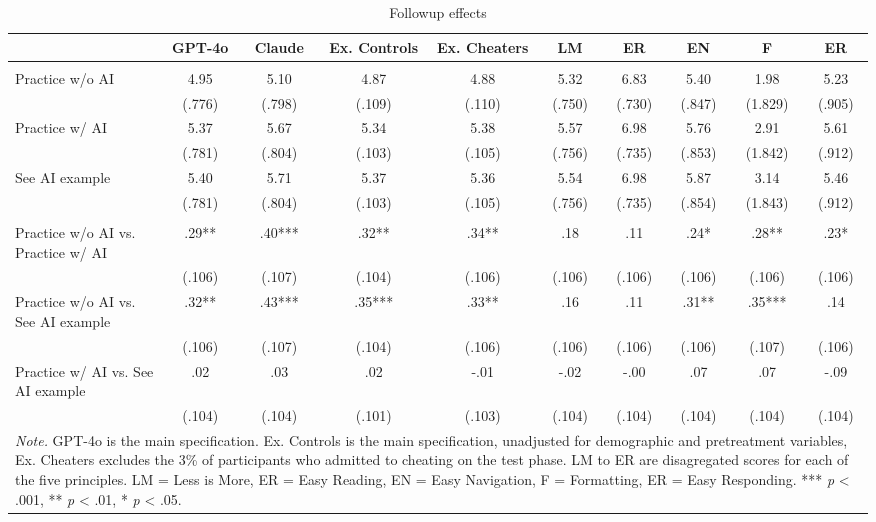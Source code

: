 \documentclass[11pt]{report}
\begin{document}
\begin{append}
\begin{table}[ht]
    \centering
        \caption{Followup effects}

\begin{tabular}{lccccccccc}
\toprule
  & GPT-4o & Claude & Ex. Controls & Ex. Cheaters & LM & ER & EN & F & ER \\ 
\midrule\addlinespace[2.5pt]
\multicolumn{10}{l}{\textbf{Means --- (SE)}} \\ 
\midrule\addlinespace[2.5pt]
Practice w/o AI & 4.95 & 5.10 & 4.87 & 4.88 & 5.32 & 6.83 & 5.40 & 1.98 & 5.23 \\ 
 & (.776) & (.798) & (.109) & (.110) & (.750) & (.730) & (.847) & (1.829) & (.905) \\ 
Practice w/ AI & 5.37 & 5.67 & 5.34 & 5.38 & 5.57 & 6.98 & 5.76 & 2.91 & 5.61 \\ 
 & (.781) & (.804) & (.103) & (.105) & (.756) & (.735) & (.853) & (1.842) & (.912) \\ 
See AI example & 5.40 & 5.71 & 5.37 & 5.36 & 5.54 & 6.98 & 5.87 & 3.14 & 5.46 \\ 
 & (.781) & (.804) & (.103) & (.105) & (.756) & (.735) & (.854) & (1.843) & (.912) \\ 
\midrule\addlinespace[2.5pt]
\multicolumn{10}{l}{\textbf{Effect Sizes (d) --- (SE)}} \\ 
\midrule\addlinespace[2.5pt]
Practice w/o AI vs. Practice w/ AI & .29** & .40*** & .32** & .34** & .18 & .11 & .24* & .28** & .23* \\ 
 & (.106) & (.107) & (.104) & (.106) & (.106) & (.106) & (.106) & (.106) & (.106) \\ 
Practice w/o AI vs. See AI example & .32** & .43*** & .35*** & .33** & .16 & .11 & .31** & .35*** & .14 \\ 
 & (.106) & (.107) & (.104) & (.106) & (.106) & (.106) & (.106) & (.107) & (.106) \\ 
Practice w/ AI vs. See AI example & .02 & .03 & .02 & -.01 & -.02 & -.00 & .07 & .07 & -.09 \\ 
 & (.104) & (.104) & (.101) & (.103) & (.104) & (.104) & (.104) & (.104) & (.104) \\ 
\midrule
\multicolumn{10}{p{15cm}}{\textit{Note.} GPT-4o is the main specification. Ex. Controls is the main specification, unadjusted for demographic and pretreatment variables, Ex. Cheaters excludes the 3\% of participants who admitted to cheating on the test phase. LM to ER are disagregated scores for each of the five principles. LM = Less is More, ER = Easy Reading, EN = Easy Navigation, F = Formatting, ER = Easy Responding. *** \textit{p} < .001, ** \textit{p} < .01, * \textit{p} < .05.}
\vspace{5pt}
\end{tabular}
    \label{tab:s3_followup}
\end{table}


\end{append}
\end{document}
